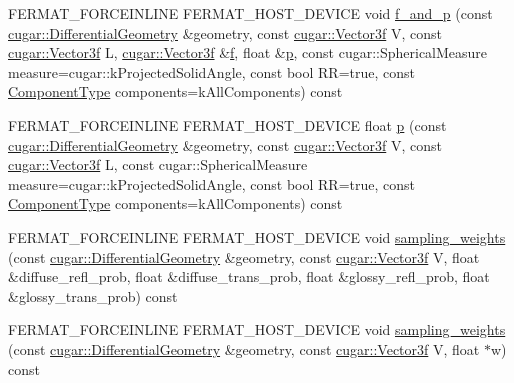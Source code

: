\begin{DoxyCompactItemize}
\item 
F\+E\+R\+M\+A\+T\+\_\+\+F\+O\+R\+C\+E\+I\+N\+L\+I\+NE F\+E\+R\+M\+A\+T\+\_\+\+H\+O\+S\+T\+\_\+\+D\+E\+V\+I\+CE void \hyperlink{struct_bsdf_a67523c8158f74a07a6ed0b32b97f6bb2}{f\+\_\+and\+\_\+p} (const \hyperlink{structcugar_1_1_differential_geometry}{cugar\+::\+Differential\+Geometry} \&geometry, const \hyperlink{structcugar_1_1_vector}{cugar\+::\+Vector3f} V, const \hyperlink{structcugar_1_1_vector}{cugar\+::\+Vector3f} L, \hyperlink{structcugar_1_1_vector}{cugar\+::\+Vector3f} \&\hyperlink{struct_bsdf_a58f402b71508cb422ebe3f0e628fd2fd}{f}, float \&\hyperlink{struct_bsdf_a88c3b1f89a3248d4b2684fd402a59ced}{p}, const cugar\+::\+Spherical\+Measure measure=cugar\+::k\+Projected\+Solid\+Angle, const bool RR=true, const \hyperlink{struct_bsdf_a5f7db6f81220ed9ee6da109d6eb5b585}{Component\+Type} components=k\+All\+Components) const
\item 
F\+E\+R\+M\+A\+T\+\_\+\+F\+O\+R\+C\+E\+I\+N\+L\+I\+NE F\+E\+R\+M\+A\+T\+\_\+\+H\+O\+S\+T\+\_\+\+D\+E\+V\+I\+CE float \hyperlink{struct_bsdf_a88c3b1f89a3248d4b2684fd402a59ced}{p} (const \hyperlink{structcugar_1_1_differential_geometry}{cugar\+::\+Differential\+Geometry} \&geometry, const \hyperlink{structcugar_1_1_vector}{cugar\+::\+Vector3f} V, const \hyperlink{structcugar_1_1_vector}{cugar\+::\+Vector3f} L, const cugar\+::\+Spherical\+Measure measure=cugar\+::k\+Projected\+Solid\+Angle, const bool RR=true, const \hyperlink{struct_bsdf_a5f7db6f81220ed9ee6da109d6eb5b585}{Component\+Type} components=k\+All\+Components) const
\item 
F\+E\+R\+M\+A\+T\+\_\+\+F\+O\+R\+C\+E\+I\+N\+L\+I\+NE F\+E\+R\+M\+A\+T\+\_\+\+H\+O\+S\+T\+\_\+\+D\+E\+V\+I\+CE void \hyperlink{struct_bsdf_a6484768a455903e0bc0946d3d9722940}{sampling\+\_\+weights} (const \hyperlink{structcugar_1_1_differential_geometry}{cugar\+::\+Differential\+Geometry} \&geometry, const \hyperlink{structcugar_1_1_vector}{cugar\+::\+Vector3f} V, float \&diffuse\+\_\+refl\+\_\+prob, float \&diffuse\+\_\+trans\+\_\+prob, float \&glossy\+\_\+refl\+\_\+prob, float \&glossy\+\_\+trans\+\_\+prob) const
\item 
F\+E\+R\+M\+A\+T\+\_\+\+F\+O\+R\+C\+E\+I\+N\+L\+I\+NE F\+E\+R\+M\+A\+T\+\_\+\+H\+O\+S\+T\+\_\+\+D\+E\+V\+I\+CE void \hyperlink{struct_bsdf_aa3382a14f577b359f61cca760a7d1296}{sampling\+\_\+weights} (const \hyperlink{structcugar_1_1_differential_geometry}{cugar\+::\+Differential\+Geometry} \&geometry, const \hyperlink{structcugar_1_1_vector}{cugar\+::\+Vector3f} V, float $\ast$w) const
\item 

\end{DoxyCompactItemize}
